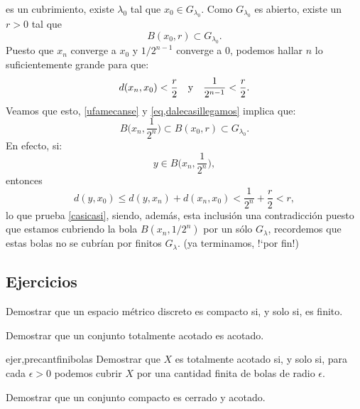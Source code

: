 \begin{demo}
es un cubrimiento, existe $\lambda_0$ tal que $x_0\in G_{\lambda_0}$. Como
$G_{\lambda_0}$ es abierto, existe un $r>0$ tal que
\begin{equation}\label{eq,dalecasillegamos}
	B(x_0,r)\subset G_{\lambda_0}.
\end{equation}
Puesto que $x_n$ converge a $x_0$ y $1/2^{n-1}$ converge a 0,
podemos hallar $n$ lo suficientemente grande para que:
\begin{equation}\label{ufamecanse}
	d(x_n,x_0)<\frac{r}{2}\quad\hbox{y}\quad
	\frac{1}{2^{n-1}}<\frac{r}{2}.
\end{equation}
Veamos que esto, \eqref{ufamecanse} y \eqref{eq,dalecasillegamos}
implica que:
\begin{equation}\label{casicasi}
	B\Big(x_n,\frac{1}{2^n}\Big)\subset B(x_0,r)\subset G_{\lambda_0}.
\end{equation}
En efecto, si:
\[
	 y\in B\Big(x_n,\frac{1}{2^n}\Big),
\]
entonces
\[
	d(y,x_0)\leq d(y,x_n)+d(x_n,x_0)<\frac{1}{2^n}+\frac{r}{2}<r,
\]
lo que prueba \eqref{casicasi}, siendo, además, esta inclusión
una contradicción puesto que estamos cubriendo la bola
$B(x_n,1/2^n)$ por un sólo $G_{\lambda}$, recordemos que estas
bolas no se cubrían por finitos $G_{\lambda}$. (ya terminamos,
!`por fin!)
 \end{demo}

 \subsection{Ejercicios}
 
 

\begin{ejercicio}{} Demostrar que un espacio métrico discreto es compacto
si, y solo si, es finito.
\end{ejercicio}

\begin{ejercicio}{} Demostrar que un conjunto totalmente acotado es
acotado.
\end{ejercicio}



\begin{ejercicio}{ejer,precantfinibolas} Demostrar que $X$ es totalmente acotado si, y
solo si, para cada $\epsilon>0$ podemos cubrir $X$ por una cantidad
finita de bolas de radio $\epsilon$.
\end{ejercicio}

\begin{ejercicio}{} Demostrar que un conjunto compacto es cerrado y
acotado.
\end{ejercicio}


